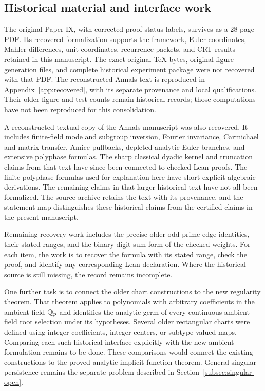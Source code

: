 \subsection{Historical material and interface work}
\label{subsec:historical-scope}

The original Paper IX, with corrected proof-status labels, survives as a
28-page PDF. Its recovered formalization supports the framework, Euler
coordinates, Mahler differences,
unit coordinates, recurrence packets, and CRT results retained in this
manuscript. The exact original TeX bytes, original figure-generation files, and complete
historical experiment package were not recovered with that PDF.
The reconstructed Annals text is reproduced in Appendix~\ref{app:recovered},
with its separate provenance and local qualifications. Their older
figure and test counts remain historical records; those computations have
not been reproduced for this consolidation.

A reconstructed textual copy of the Annals manuscript was also recovered.
It includes finite-field mode and subgroup inversion, Fourier invariance,
Carmichael and matrix transfer, Amice pullbacks, depleted analytic Euler
branches, and extensive polyphase formulas. The sharp classical dyadic kernel
and truncation claims from that text have since been connected to checked
Lean proofs. The finite polyphase formulas used for explanation here have
short explicit algebraic derivations. The remaining claims in that larger
historical text have not all been formalized.
The source archive retains the text with its provenance, and the statement
map distinguishes these historical claims from the certified claims in the
present manuscript.

Remaining recovery work includes the precise older odd-prime edge identities,
their stated ranges, and the binary digit-sum form of the checked weights.
For each item, the work is to recover the formula with its stated range,
check the proof, and identify any corresponding Lean declaration. Where the
historical source is still missing, the record remains incomplete.

One further task is to connect the older chart constructions to the new
regularity theorem. That theorem applies to polynomials with arbitrary
coefficients in the ambient field $\mathbb Q_p$ and identifies the analytic
germ of every continuous ambient-field root selection under its hypotheses.
Several older rectangular charts were defined using integer coefficients,
integer centers, or subtype-valued maps. Comparing each such historical
interface explicitly with the new ambient formulation remains to be done.
These comparisons would connect the existing constructions to the proved
analytic implicit-function theorem. General singular persistence remains the
separate problem described in Section~\ref{subsec:singular-open}.
